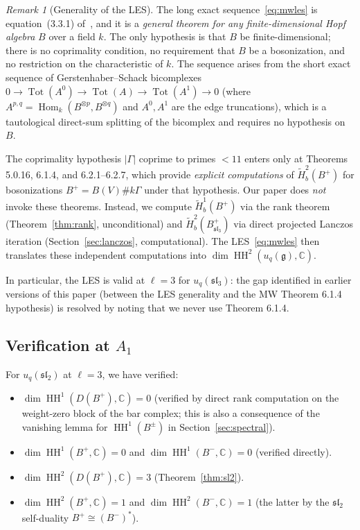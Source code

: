 \documentclass[11pt,letterpaper]{amsart}
\theoremstyle{plain}
\theoremstyle{definition}
\theoremstyle{remark}
\newtheorem{remark}[theorem]{Remark}
\newcommand{\HH}{\operatorname{HH}}
\newcommand{\CC}{\mathbb{C}}
\begin{document}
\begin{remark}[Generality of the LES]
\label{rem:lesgenerality}
The long exact sequence~\eqref{eq:mwles} is equation~(3.3.1) of~\cite{MW08}, and it is a \emph{general theorem for any finite-dimensional Hopf algebra} $B$ over a field $k$. The only hypothesis is that $B$ be finite-dimensional; there is no coprimality condition, no requirement that $B$ be a bosonization, and no restriction on the characteristic of $k$. The sequence arises from the short exact sequence of Gerstenhaber--Schack bicomplexes $0 \to \operatorname{Tot}(A^0) \to \operatorname{Tot}(A) \to \operatorname{Tot}(A^1) \to 0$ (where $A^{p,q} = \operatorname{Hom}_k(B^{\otimes p}, B^{\otimes q})$ and $A^0, A^1$ are the edge truncations), which is a tautological direct-sum splitting of the bicomplex and requires no hypothesis on $B$.

The coprimality hypothesis $|\Gamma|$ coprime to primes $< 11$ enters \cite{MW08} only at Theorems 5.0.16, 6.1.4, and 6.2.1--6.2.7, which provide \emph{explicit computations} of $\tilde{H}^2_b(B^+)$ for bosonizations $B^+ = B(V) \# k\Gamma$ under that hypothesis. Our paper does \emph{not} invoke these theorems. Instead, we compute $\tilde{H}^1_b(B^+)$ via the rank theorem (Theorem~\ref{thm:rank}, unconditional) and $\tilde{H}^2_b(B^+_{\mathfrak{sl}_3})$ via direct projected Lanczos iteration (Section~\ref{sec:lanczos}, computational). The LES~\eqref{eq:mwles} then translates these independent computations into $\dim \HH^2(u_q(\mathfrak{g}), \CC)$.

In particular, the LES is valid at $\ell = 3$ for $u_q(\mathfrak{sl}_3)$: the gap identified in earlier versions of this paper (between the LES generality and the MW Theorem 6.1.4 hypothesis) is resolved by noting that we never use Theorem 6.1.4.
\end{remark}

\figMWLES

\subsection{Verification at $A_1$}

For $u_q(\mathfrak{sl}_2)$ at $\ell = 3$, we have verified:
\begin{itemize}
\item $\dim \HH^1(D(B^+), \CC) = 0$ (verified by direct rank computation on the weight-zero block of the bar complex; this is also a consequence of the vanishing lemma for $\HH^1(B^\pm)$ in Section~\ref{sec:spectral}).
\item $\dim \HH^1(B^+, \CC) = 0$ and $\dim \HH^1(B^-, \CC) = 0$ (verified directly).
\item $\dim \HH^2(D(B^+), \CC) = 3$ (Theorem~\ref{thm:sl2}).
\item $\dim \HH^2(B^+, \CC) = 1$ and $\dim \HH^2(B^-, \CC) = 1$ (the latter by the $\mathfrak{sl}_2$ self-duality $B^+ \cong (B^-)^*$).
\end{itemize}
\end{document}
